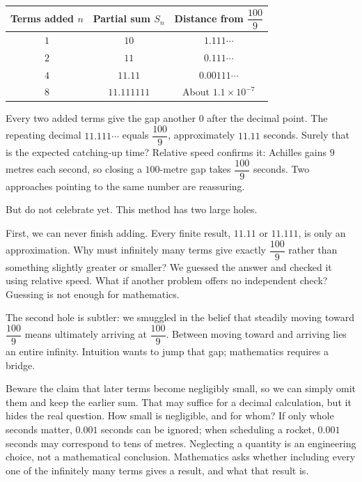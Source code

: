 \begin{center}
\begin{tabular}{ccc}
\toprule
Terms added $n$ & Partial sum $S_n$ & Distance from $\dfrac{100}{9}$ \\
\midrule
$1$ & $10$ & $1.111\cdots$ \\
$2$ & $11$ & $0.111\cdots$ \\
$4$ & $11.11$ & $0.00111\cdots$ \\
$8$ & $11.111111$ & About $1.1\times 10^{-7}$ \\
\bottomrule
\end{tabular}
\end{center}

Every two added terms give the gap another $0$ after the decimal point. The repeating decimal $11.111\cdots$ equals $\dfrac{100}{9}$, approximately $11.11$ seconds. Surely that is the expected catching-up time? Relative speed confirms it: Achilles gains $9$ metres each second, so closing a $100$-metre gap takes $\dfrac{100}{9}$ seconds. Two approaches pointing to the same number are reassuring.

But do not celebrate yet. This method has two large holes.

First, we can never finish adding. Every finite result, $11.11$ or $11.111$, is only an approximation. Why must infinitely many terms give exactly $\dfrac{100}{9}$ rather than something slightly greater or smaller? We guessed the answer and checked it using relative speed. What if another problem offers no independent check? Guessing is not enough for mathematics.

The second hole is subtler: we smuggled in the belief that steadily moving toward $\dfrac{100}{9}$ means ultimately arriving at $\dfrac{100}{9}$. Between moving toward and arriving lies an entire infinity. Intuition wants to jump that gap; mathematics requires a bridge.

\begin{fanli}
Beware the claim that later terms become negligibly small, so we can simply omit them and keep the earlier sum. That may suffice for a decimal calculation, but it hides the real question. How small is negligible, and for whom? If only whole seconds matter, $0.001$ seconds can be ignored; when scheduling a rocket, $0.001$ seconds may correspond to tens of metres. Neglecting a quantity is an engineering choice, not a mathematical conclusion. Mathematics asks whether including every one of the infinitely many terms gives a result, and what that result is.
\end{fanli}


